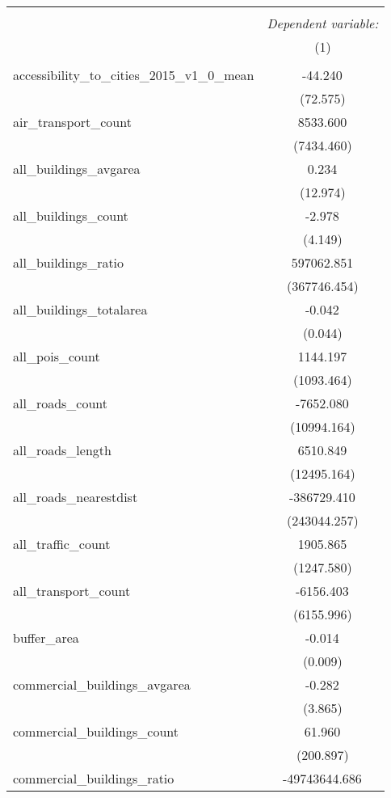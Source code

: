 \begin{table}[!htbp] \centering
\begin{tabular}{@{\extracolsep{5pt}}lc}
\\[-1.8ex]\hline
\hline \\[-1.8ex]
& \multicolumn{1}{c}{\textit{Dependent variable:}} \
\cr \cline{1-2}
\\[-1.8ex] & (1) \\
\hline \\[-1.8ex]
 accessibility_to_cities_2015_v1_0_mean & -44.240$^{}$ \\
  & (72.575) \\
 air_transport_count & 8533.600$^{}$ \\
  & (7434.460) \\
 all_buildings_avgarea & 0.234$^{}$ \\
  & (12.974) \\
 all_buildings_count & -2.978$^{}$ \\
  & (4.149) \\
 all_buildings_ratio & 597062.851$^{}$ \\
  & (367746.454) \\
 all_buildings_totalarea & -0.042$^{}$ \\
  & (0.044) \\
 all_pois_count & 1144.197$^{}$ \\
  & (1093.464) \\
 all_roads_count & -7652.080$^{}$ \\
  & (10994.164) \\
 all_roads_length & 6510.849$^{}$ \\
  & (12495.164) \\
 all_roads_nearestdist & -386729.410$^{}$ \\
  & (243044.257) \\
 all_traffic_count & 1905.865$^{}$ \\
  & (1247.580) \\
 all_transport_count & -6156.403$^{}$ \\
  & (6155.996) \\
 buffer_area & -0.014$^{}$ \\
  & (0.009) \\
 commercial_buildings_avgarea & -0.282$^{}$ \\
  & (3.865) \\
 commercial_buildings_count & 61.960$^{}$ \\
  & (200.897) \\
 commercial_buildings_ratio & -49743644.686$^{}$ \\

\end{tabular}
\end{table}
